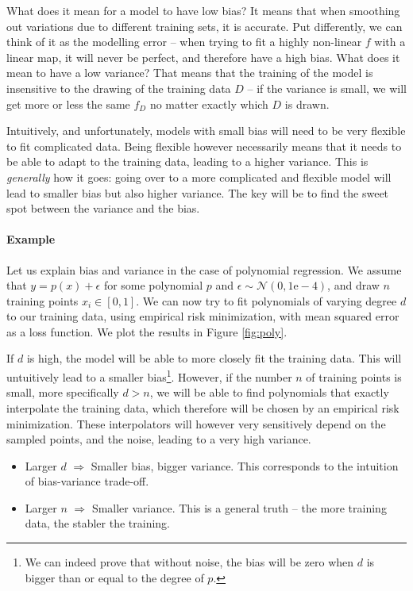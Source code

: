 \documentclass{article}
\begin{document}
What does it mean for a model to have low bias? It means that when smoothing out variations due to different training sets, it is accurate. Put differently, we can think of it as the modelling error -- when trying to fit a highly non-linear $f$ with a linear map, it will never be perfect, and therefore have a high bias. What does it mean to have a low variance? That means that the training of the model is insensitive to the drawing of the training data $D$ -- if the variance is small, we will get more or less the same $f_D$ no matter exactly which $D$ is drawn.

Intuitively, and unfortunately, models with small bias will need to be very flexible to fit complicated data. Being flexible however necessarily means that it needs to be able to adapt to the training data, leading to a higher variance. This is \emph{generally} how it goes: going over to a more complicated and flexible model will lead to smaller bias but also higher variance. The key will be to find the sweet spot between the variance and the bias.

\paragraph{Example} Let us explain bias and variance in the case of polynomial regression. We assume that $y=p(x)+\epsilon$ for some polynomial $p$ and $\epsilon \sim \mathcal{N}(0,1\mathrm{e-4})$, and draw $n$ training points $x_i \in [0,1]$. We can now try to fit polynomials of varying degree $d$ to our training data, using empirical risk minimization, with mean squared error as a loss function. We plot the results in Figure \ref{fig:poly}.

If $d$ is high, the model will be able to more closely fit the training data. This will untuitively lead to a smaller bias\footnote{We can indeed prove that without noise, the bias will be zero when $d$ is bigger than or equal to the degree of $p$.}. However, if the number $n$ of training points is small, more specifically $d>n$, we will be able to find polynomials that exactly interpolate the training data, which therefore will be chosen by an empirical risk minimization. These interpolators will however very sensitively depend on the sampled points, and the noise, leading to a very high variance.
\begin{itemize}
    \item Larger $d$ $\Rightarrow$ Smaller bias, bigger variance. This corresponds to the intuition of bias-variance trade-off.
    \item Larger $n$ $\Rightarrow$ Smaller variance. This is a general truth -- the more training data, the stabler the training.
\end{itemize}
\end{document}
